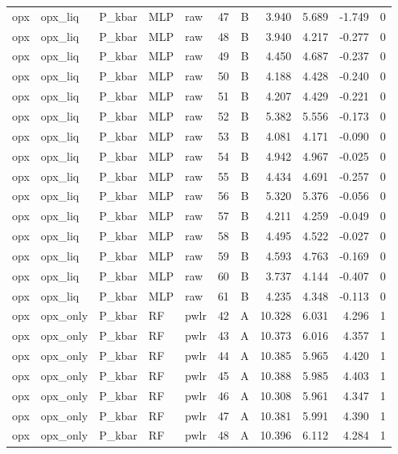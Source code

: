 \begin{longtable}{lllllrrrrrr}
opx & opx\_liq & P\_kbar & MLP & raw & 47 & B & 3.940 & 5.689 & -1.749 & 0 \\
opx & opx\_liq & P\_kbar & MLP & raw & 48 & B & 3.940 & 4.217 & -0.277 & 0 \\
opx & opx\_liq & P\_kbar & MLP & raw & 49 & B & 4.450 & 4.687 & -0.237 & 0 \\
opx & opx\_liq & P\_kbar & MLP & raw & 50 & B & 4.188 & 4.428 & -0.240 & 0 \\
opx & opx\_liq & P\_kbar & MLP & raw & 51 & B & 4.207 & 4.429 & -0.221 & 0 \\
opx & opx\_liq & P\_kbar & MLP & raw & 52 & B & 5.382 & 5.556 & -0.173 & 0 \\
opx & opx\_liq & P\_kbar & MLP & raw & 53 & B & 4.081 & 4.171 & -0.090 & 0 \\
opx & opx\_liq & P\_kbar & MLP & raw & 54 & B & 4.942 & 4.967 & -0.025 & 0 \\
opx & opx\_liq & P\_kbar & MLP & raw & 55 & B & 4.434 & 4.691 & -0.257 & 0 \\
opx & opx\_liq & P\_kbar & MLP & raw & 56 & B & 5.320 & 5.376 & -0.056 & 0 \\
opx & opx\_liq & P\_kbar & MLP & raw & 57 & B & 4.211 & 4.259 & -0.049 & 0 \\
opx & opx\_liq & P\_kbar & MLP & raw & 58 & B & 4.495 & 4.522 & -0.027 & 0 \\
opx & opx\_liq & P\_kbar & MLP & raw & 59 & B & 4.593 & 4.763 & -0.169 & 0 \\
opx & opx\_liq & P\_kbar & MLP & raw & 60 & B & 3.737 & 4.144 & -0.407 & 0 \\
opx & opx\_liq & P\_kbar & MLP & raw & 61 & B & 4.235 & 4.348 & -0.113 & 0 \\
opx & opx\_only & P\_kbar & RF & pwlr & 42 & A & 10.328 & 6.031 & 4.296 & 1 \\
opx & opx\_only & P\_kbar & RF & pwlr & 43 & A & 10.373 & 6.016 & 4.357 & 1 \\
opx & opx\_only & P\_kbar & RF & pwlr & 44 & A & 10.385 & 5.965 & 4.420 & 1 \\
opx & opx\_only & P\_kbar & RF & pwlr & 45 & A & 10.388 & 5.985 & 4.403 & 1 \\
opx & opx\_only & P\_kbar & RF & pwlr & 46 & A & 10.308 & 5.961 & 4.347 & 1 \\
opx & opx\_only & P\_kbar & RF & pwlr & 47 & A & 10.381 & 5.991 & 4.390 & 1 \\
opx & opx\_only & P\_kbar & RF & pwlr & 48 & A & 10.396 & 6.112 & 4.284 & 1 \\

\end{longtable}
